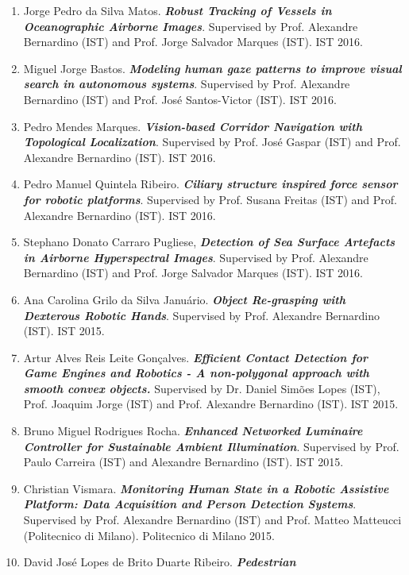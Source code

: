 \documentclass[
]{article}
\begin{document}
\begin{enumerate}
{{  tracking for mobile robots}}. Supervised by Prof. Alexandre Bernardino
  (IST). IST 2016.
\item
  Jorge Pedro da Silva Matos. \emph{\textbf{Robust Tracking of Vessels
  in Oceanographic Airborne Images}}. Supervised by Prof. Alexandre
  Bernardino (IST) and Prof. Jorge Salvador Marques (IST). IST 2016.
\item
  Miguel Jorge Bastos. \emph{\textbf{Modeling human gaze patterns to
  improve visual search in autonomous systems}}. Supervised by Prof.
  Alexandre Bernardino (IST) and Prof. José Santos-Victor (IST). IST
  2016.
\item
  Pedro Mendes Marques. \emph{\textbf{Vision-based Corridor Navigation
  with Topological Localization}}. Supervised by Prof. José Gaspar (IST)
  and Prof. Alexandre Bernardino (IST). IST 2016.
\item
  Pedro Manuel Quintela Ribeiro. \emph{\textbf{Ciliary structure
  inspired force sensor for robotic platforms}}. Supervised by Prof.
  Susana Freitas (IST) and Prof. Alexandre Bernardino (IST). IST 2016.
\item
  Stephano Donato Carraro Pugliese, \emph{\textbf{Detection of Sea
  Surface Artefacts in Airborne Hyperspectral Images}}. Supervised by
  Prof. Alexandre Bernardino (IST) and Prof. Jorge Salvador Marques
  (IST). IST 2016.
\item
  Ana Carolina Grilo da Silva Januário. \emph{\textbf{Object Re-grasping
  with Dexterous Robotic Hands}}. Supervised by Prof. Alexandre
  Bernardino (IST). IST 2015.
\item
  Artur Alves Reis Leite Gonçalves. \emph{\textbf{Efficient Contact
  Detection for Game Engines and Robotics - A non-polygonal approach
  with smooth convex objects.}} Supervised by Dr. Daniel Simões Lopes
  (IST), Prof. Joaquim Jorge (IST) and Prof. Alexandre Bernardino (IST).
  IST 2015.
\item
  Bruno Miguel Rodrigues Rocha. \emph{\textbf{Enhanced Networked
  Luminaire Controller for Sustainable Ambient Illumination}}.
  Supervised by Prof. Paulo Carreira (IST) and Alexandre Bernardino
  (IST). IST 2015.
\item
  Christian Vismara. \emph{\textbf{Monitoring Human State in a Robotic
  Assistive Platform: Data Acquisition and Person Detection Systems}}.
  Supervised by Prof. Alexandre Bernardino (IST) and Prof. Matteo
  Matteucci (Politecnico di Milano). Politecnico di Milano 2015.
\item
  David José Lopes de Brito Duarte Ribeiro. \emph{\textbf{Pedestrian
}}
\end{enumerate}
\end{document}
